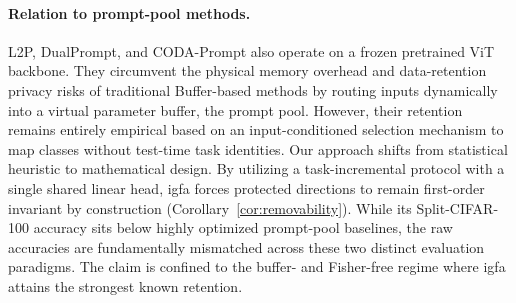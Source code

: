 \documentclass[10pt,a4paper]{article}
\theoremstyle{plain}
\theoremstyle{definition}
\newcommand{\IGFA}{igfa}
\begin{document}
\paragraph{Relation to prompt-pool methods.} L2P, DualPrompt, and CODA-Prompt
\cite{wang2022l2p,wang2022dualprompt,smith2023coda} also operate on a frozen pretrained ViT backbone.
They circumvent the physical memory overhead and data-retention privacy risks of traditional Buffer-based
methods by routing inputs dynamically into a virtual parameter buffer, the prompt pool. 
However, their retention remains entirely empirical based on
an input-conditioned selection mechanism to map classes without test-time task identities.
Our approach shifts from statistical heuristic to mathematical design.
By utilizing a task-incremental protocol with a single shared linear head, \IGFA{} forces
protected directions to remain first-order invariant by construction
(Corollary~\ref{cor:removability}).
While its Split-CIFAR-100 accuracy sits below highly optimized prompt-pool baselines,
the raw accuracies are fundamentally mismatched across these two distinct evaluation paradigms.
The claim is confined to the buffer- and Fisher-free regime where \IGFA{} attains the strongest known retention.
\end{document}
